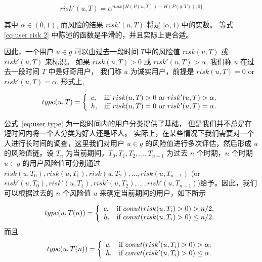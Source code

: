 \begin{equation}\label{eq:user risk 2}
risk'(u,T)=\alpha ^ {max \{H(P(u,T))-H(P(g,T)),0\}}
\end{equation}

其中 $\alpha \in (0,1)$, 而风险的结果 $risk'(u,T)$ 将是 $[\alpha, 1)$ 中的实数。 等式 \ref{eq:user risk 2} 中陈述的函数是平滑的，并且实际上更合适。

因此，一个用户 $u \in g$ 可以由过去一段时间 $T$中的风险值 $risk(u,T)$ 或 $risk'(u,T)$ 来标识。 如果 $risk(u,T) > 0$ 或 $risk'(u,T)>\alpha$, 我们称 $u$ 在过去一段时间 $T$ 中是好奇用户， 我们称 $u$ 为诚实用户，前提是  $risk(u,T) = 0$ or $risk'(u,T)=\alpha$. 形式上,

\begin{equation}\label{eq:user type}
type(u,T)=
\left\{
\begin{array}{ll}
c, & \hbox{iff $risk(u,T) > 0$ or $risk'(u,T)>\alpha$;} \\
h, & \hbox{iff  $risk(u,T) = 0$ or $risk'(u,T)=\alpha$.} \\
\end{array}
\right.
\end{equation}

公式~\ref{eq:user type} 为一段时间内的用户分类提供了基础， 但是我们并不总是在短时间内将一个人分类为好人还是坏人。 实际上，在某些情况下我们需要对一个人进行长时间的调查，这里我们对用户 $u \in g$ 的风险值进行多次评估，然后形成 $u$ 的风险值链。设 $T_n$ 为当前期间，$T_0, T_1, T_2, ..., T_{n-1}$ 为过去 $n$ 个时期，$n$ 个时期 $u \in g$ 的用户风险值可分别通过 $risk(u,T_0),risk(u,T_1),risk(u,T_2),..., risk(u,T_{n-1})$ (or $risk'(u,T_0), risk'(u,T_1), risk'(u,T_2), ..., risk'(u,T_{n-1})$)给予。因此，我们可以根据过去的 $n$ 个风险值 $u$ 来确定当前期间的用户，如下所示

\begin{equation}\label{eq:user type Tn 1}
type(u,T(n))=
\left\{
\begin{array}{ll}
c, & \hbox{if $conut(risk(u,T_i) > 0) > n/2$;} \\
h, & \hbox{if $conut(risk(u,T_i) > 0) \leq n/2$.} \\
\end{array}
\right.
\end{equation}
而且
\begin{equation}\label{eq:user type Tn 2}
type(u,T(n))=
\left\{
\begin{array}{ll}
c, & \hbox{if $conut(risk'(u,T_i) > 0) > \alpha$;} \\
h, & \hbox{if $conut(risk'(u,T_i) > 0) \leq \alpha$.} \\
\end{array}
\right.
\end{equation}

